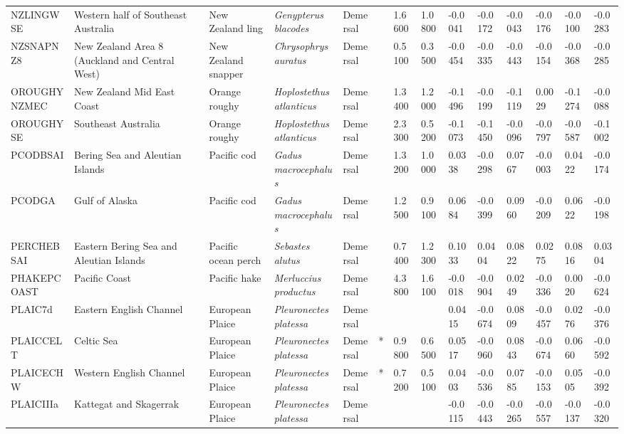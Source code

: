 \begin{longtable}{p{2.8cm}p{2cm}p{1.7cm}p{1.7cm}p{1cm}p{0.3cm}p{1cm}p{1cm}p{1cm}p{1cm}p{1cm}p{1cm}p{1cm}p{1cm}}
  NZLINGWSE & Western half of Southeast Australia & New Zealand ling & \textit{Genypterus blacodes} & Demersal &   & 1.6600 & 1.0800 & -0.0041 & -0.0172 & -0.0043 & -0.0176 & -0.0100 & -0.0283 \\ 
  NZSNAPNZ8 & New Zealand Area 8 (Auckland and Central West) & New Zealand snapper & \textit{Chrysophrys auratus} & Demersal &   & 0.5100 & 0.3500 & -0.0454 & -0.0335 & -0.0443 & -0.0154 & -0.0368 & -0.0285 \\ 
  OROUGHYNZMEC & New Zealand Mid East Coast & Orange roughy & \textit{Hoplostethus atlanticus} & Demersal &   & 1.3400 & 1.2000 & -0.1496 & -0.0199 & -0.1119 & 0.0029 & -0.1274 & -0.0088 \\ 
  OROUGHYSE & Southeast Australia & Orange roughy & \textit{Hoplostethus atlanticus} & Demersal &   & 2.3300 & 0.5200 & -0.1073 & -0.1450 & -0.0096 & -0.0797 & -0.0587 & -0.1002 \\ 
  PCODBSAI & Bering Sea and Aleutian Islands & Pacific cod & \textit{Gadus macrocephalus} & Demersal &   & 1.3200 & 1.0000 & 0.0338 & -0.0298 & 0.0767 & -0.0003 & 0.0422 & -0.0174 \\ 
  PCODGA & Gulf of Alaska & Pacific cod & \textit{Gadus macrocephalus} & Demersal &   & 1.2500 & 0.9100 & 0.0684 & -0.0399 & 0.0960 & -0.0209 & 0.0622 & -0.0198 \\ 
  PERCHEBSAI & Eastern Bering Sea and Aleutian Islands & Pacific ocean perch & \textit{Sebastes alutus} & Demersal &   & 0.7400 & 1.2300 & 0.1033 & 0.0404 & 0.0822 & 0.0275 & 0.0816 & 0.0304 \\ 
  PHAKEPCOAST & Pacific Coast & Pacific hake & \textit{Merluccius productus} & Demersal &   & 4.3800 & 1.6100 & -0.0018 & -0.0904 & 0.0249 & -0.0336 & 0.0020 & -0.0624 \\ 
  PLAIC7d & Eastern English Channel & European Plaice & \textit{Pleuronectes platessa} & Demersal &  &  &  & 0.0415 & -0.0674 & 0.0809 & -0.0457 & 0.0276 & -0.0376 \\ 
  PLAICCELT & Celtic Sea & European Plaice & \textit{Pleuronectes platessa} & Demersal & * & 0.9800 & 0.6500 & 0.0517 & -0.0960 & 0.0843 & -0.0674 & 0.0660 & -0.0592 \\ 
  PLAICECHW & Western English Channel & European Plaice & \textit{Pleuronectes platessa} & Demersal & * & 0.7200 & 0.5100 & 0.0403 & -0.0536 & 0.0785 & -0.0153 & 0.0505 & -0.0392 \\ 
  PLAICIIIa & Kattegat and Skagerrak & European Plaice & \textit{Pleuronectes platessa} & Demersal &  &  &  & -0.0115 & -0.0443 & -0.0265 & -0.0557 & -0.0137 & -0.0320 \\ 

\end{longtable}
